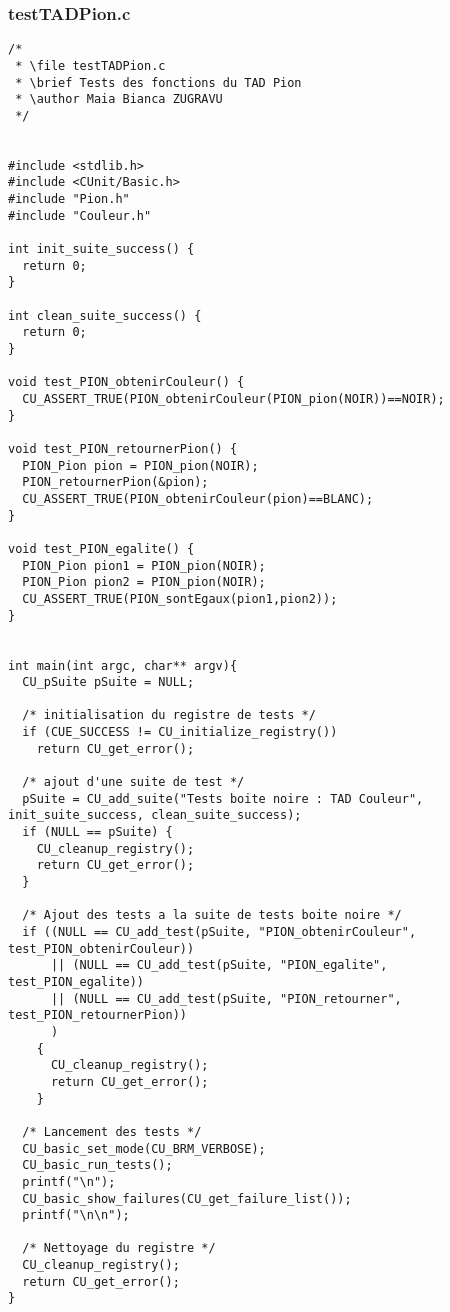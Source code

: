 \subsubsection{testTADPion.c}
\begin{lstlisting}
/*
 * \file testTADPion.c
 * \brief Tests des fonctions du TAD Pion
 * \author Maia Bianca ZUGRAVU
 */


#include <stdlib.h>
#include <CUnit/Basic.h>
#include "Pion.h"
#include "Couleur.h"

int init_suite_success() {
  return 0;
}

int clean_suite_success() {
  return 0;
}

void test_PION_obtenirCouleur() {
  CU_ASSERT_TRUE(PION_obtenirCouleur(PION_pion(NOIR))==NOIR);
}

void test_PION_retournerPion() {
  PION_Pion pion = PION_pion(NOIR);
  PION_retournerPion(&pion);
  CU_ASSERT_TRUE(PION_obtenirCouleur(pion)==BLANC);
}

void test_PION_egalite() {
  PION_Pion pion1 = PION_pion(NOIR);
  PION_Pion pion2 = PION_pion(NOIR);
  CU_ASSERT_TRUE(PION_sontEgaux(pion1,pion2));
}


int main(int argc, char** argv){
  CU_pSuite pSuite = NULL;

  /* initialisation du registre de tests */
  if (CUE_SUCCESS != CU_initialize_registry())
    return CU_get_error();

  /* ajout d'une suite de test */
  pSuite = CU_add_suite("Tests boite noire : TAD Couleur", init_suite_success, clean_suite_success);
  if (NULL == pSuite) {
    CU_cleanup_registry();
    return CU_get_error();
  }

  /* Ajout des tests a la suite de tests boite noire */
  if ((NULL == CU_add_test(pSuite, "PION_obtenirCouleur", test_PION_obtenirCouleur))
      || (NULL == CU_add_test(pSuite, "PION_egalite", test_PION_egalite))
      || (NULL == CU_add_test(pSuite, "PION_retourner", test_PION_retournerPion))
      )
    {
      CU_cleanup_registry();
      return CU_get_error();
    }

  /* Lancement des tests */
  CU_basic_set_mode(CU_BRM_VERBOSE);
  CU_basic_run_tests();
  printf("\n");
  CU_basic_show_failures(CU_get_failure_list());
  printf("\n\n");

  /* Nettoyage du registre */
  CU_cleanup_registry();
  return CU_get_error();
}
  
\end{lstlisting}

